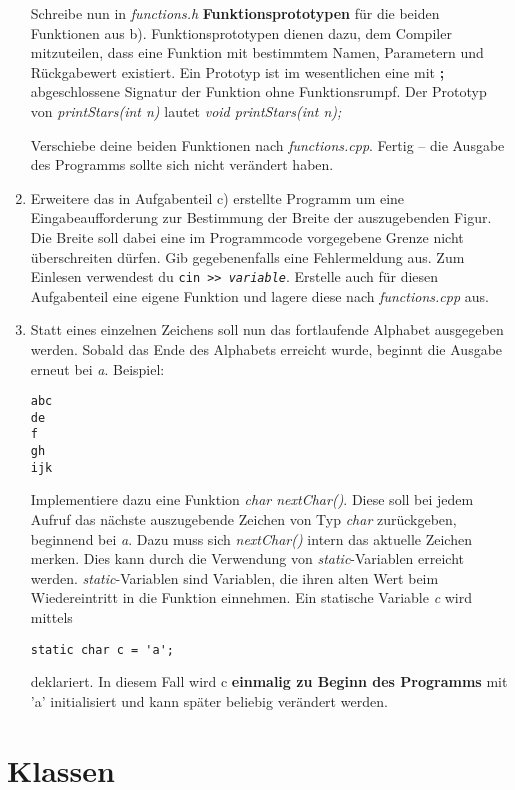\begin{enumerate}
Schreibe nun in \emph{functions.h} \textbf{Funktionsprototypen} für die beiden Funktionen aus b).
Funktionsprototypen dienen dazu, dem Compiler mitzuteilen, dass eine Funktion mit bestimmtem Namen, Parametern und Rückgabewert existiert.
Ein Prototyp ist im wesentlichen eine mit \textbf{;} abgeschlossene Signatur der Funktion ohne Funktionsrumpf.
Der Prototyp von \emph{printStars(int n)} lautet \emph{void printStars(int n);}

Verschiebe deine beiden Funktionen nach \emph{functions.cpp}.
Fertig -- die Ausgabe des Programms sollte sich nicht verändert haben.

\item
Erweitere das in Aufgabenteil c) erstellte Programm um eine Eingabeaufforderung zur Bestimmung der Breite der auszugebenden Figur.
Die Breite soll dabei eine im Programmcode vorgegebene Grenze nicht überschreiten dürfen.
Gib gegebenenfalls eine Fehlermeldung aus.
Zum Einlesen verwendest du \texttt{cin >{}> \emph{variable}}.
Erstelle auch für diesen Aufgabenteil eine eigene Funktion und lagere diese nach \emph{functions.cpp} aus.

\item Statt eines einzelnen Zeichens soll nun das fortlaufende Alphabet ausgegeben werden.
Sobald das Ende des Alphabets erreicht wurde, beginnt die Ausgabe erneut bei \emph{a}. Beispiel:
\begin{lstlisting}
abc
de
f
gh
ijk
\end{lstlisting}

Implementiere dazu eine Funktion \emph{char nextChar()}.
Diese soll bei jedem Aufruf das nächste auszugebende Zeichen von Typ \emph{char} zurückgeben, beginnend bei \emph{\textquotesingle a\textquotesingle}.
Dazu muss sich \emph{nextChar()} intern das aktuelle Zeichen merken.
Dies kann durch die Verwendung von \emph{static}-Variablen erreicht werden. \emph{static}-Variablen sind Variablen, die ihren alten Wert beim Wiedereintritt in die Funktion einnehmen.
Ein statische Variable \emph{c} wird mittels 
\begin{lstlisting}
static char c = 'a';
\end{lstlisting}
deklariert.
In diesem Fall wird c \textbf{einmalig zu Beginn des Programms} mit 'a' initialisiert und kann später beliebig verändert werden.
\end{enumerate} 

\section{Klassen}

